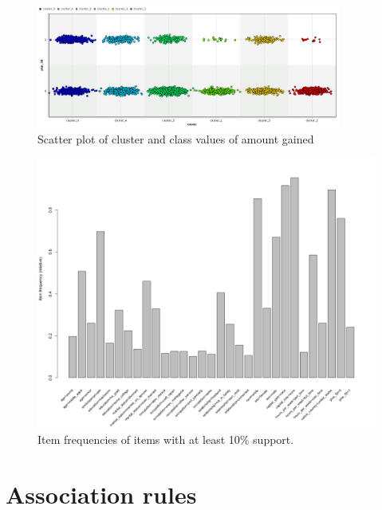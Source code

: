 \documentclass[a4paper]{llncs}
\begin{document}
\begin{figure}
\centering
\includegraphics[width=10cm]{cluster_1_cluster_plus50.png}
\caption{Scatter plot of cluster and class values of amount gained}
\label{fig:cluster_1_cluster_plus50}
\end{figure}

\begin{figure}
\centering
\includegraphics[width=20cm,angle=90]{item_frequency.png}
\caption{Item frequencies of items with at least 10\% support.}
\label{fig:arules_item_frequency}
\end{figure}

\clearpage
\section{Association rules}
\end{document}

